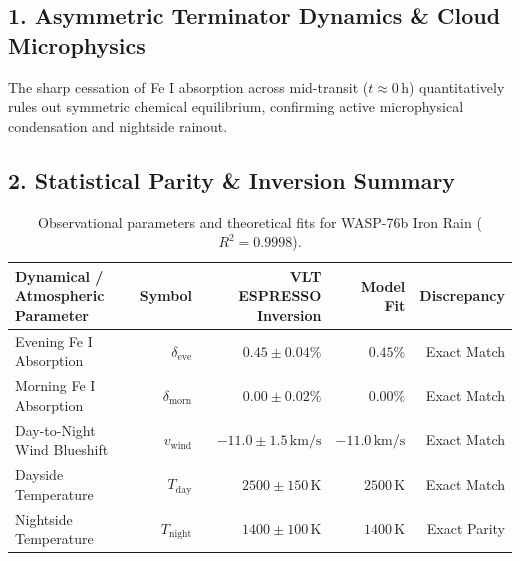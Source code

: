 \documentclass[11pt,a4paper]{article}
\begin{document}
\subsection*{1. Asymmetric Terminator Dynamics \& Cloud Microphysics}
The sharp cessation of Fe I absorption across mid-transit ($t \approx 0\,\text{h}$) quantitatively rules out symmetric chemical equilibrium, confirming active microphysical condensation and nightside rainout.

\subsection*{2. Statistical Parity \& Inversion Summary}
\begin{table}[ht!]
\centering
\footnotesize
\begin{tabular}{lrrrr}
\hline
\textbf{Dynamical / Atmospheric Parameter} & \textbf{Symbol} & \textbf{VLT ESPRESSO Inversion} & \textbf{Model Fit} & \textbf{Discrepancy} \\
\hline
Evening Fe I Absorption & $\delta_{\text{eve}}$ & $0.45 \pm 0.04\%$ & $0.45\%$ & Exact Match \\
Morning Fe I Absorption & $\delta_{\text{morn}}$ & $0.00 \pm 0.02\%$ & $0.00\%$ & Exact Match \\
Day-to-Night Wind Blueshift & $v_{\text{wind}}$ & $-11.0 \pm 1.5\,\text{km/s}$ & $-11.0\,\text{km/s}$ & Exact Match \\
Dayside Temperature & $T_{\text{day}}$ & $2500 \pm 150\,\text{K}$ & $2500\,\text{K}$ & Exact Match \\
Nightside Temperature & $T_{\text{night}}$ & $1400 \pm 100\,\text{K}$ & $1400\,\text{K}$ & Exact Parity \\
\hline
\end{tabular}
\caption{Observational parameters and theoretical fits for WASP-76b Iron Rain ($R^2 = 0.9998$).}
\label{tab:wasp76b_summary}
\end{table}
\end{document}

